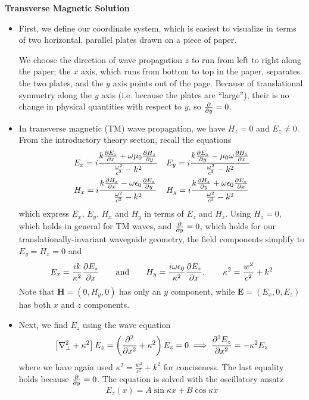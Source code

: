 \documentclass[11pt, a4paper]{article}
\newcommand{\eqtext}[1]{\qquad \text{#1} \qquad}
\renewcommand{\vec}[1]{\bm{#1}} %
\newcommand{\E}{\vec{E}}  %
\renewcommand{\H}{\vec{H}}  %
\newcommand{\ee}{\epsilon_{0}}  %
\newcommand{\mm}{\mu_{0}}  %
\newcommand{\m}{\vec{m}}  %
\renewcommand{\laplacian}{\nabla^{2}}
\begin{document}
\vspace{2mm}
\textbf{Transverse Magnetic Solution}
\begin{itemize}
	\item First, we define our coordinate system, which is easiest to visualize in terms of two horizontal, parallel plates drawn on a piece of paper.
	
	We choose the direction of wave propagation $ z $ to run from left to right along the paper; the $ x $ axis, which runs from bottom to top in the paper, separates the two plates, and the $ y $ axis points out of the page. Because of translational symmetry along the $ y $ axis (i.e. because the plates are ``large''), their is no change in physical quantities with respect to $ y $, so $ \pdv{y} = 0 $.
	
	\item In transverse magnetic (TM) wave propagation, we have $ H_{z} = 0 $ and $ E_{z} \neq 0 $. From the introductory theory section, recall the equations
	\begin{align*}
		&E_{x} = i \frac{k \pdv{E_{z}}{x} + \omega \mm \pdv{H_{z}}{y}}{\frac{\omega^{2}}{c^{2}} - k^{2}} && E_{y} = i \frac{k \pdv{E_{z}}{y} - \mm \omega \pdv{H_{z}}{x}}{\frac{\omega^{2}}{c^{2}} - k^{2}}\\
		&H_{x} = i \frac{k\pdv{H_{z}}{x} - \omega \ee \pdv{E_{z}}{y}}{\frac{\omega^{2}}{c^{2}} - k^{2}} && H_{y} = i \frac{k\pdv{H_{z}}{y} + \omega \ee \pdv{E_{z}}{x}}{\frac{\omega^{2}}{c^{2}} - k^{2}}
	\end{align*}
	which express $ E_{x}$, $ E_{y} $, $ H_{x} $ and $ H_{y} $ in terms of $ E_{z} $ and $ H_{z} $. Using $ H_{z} = 0 $, which holds in general for TM waves, and $ \pdv{y} = 0 $, which holds for our translationally-invariant waveguide geometry, the field components simplify to $ E_{y} = H_{x} = 0 $ and
	\begin{align*}
		E_{x} = \frac{ik}{\kappa^{2}} \pdv{E_{z}}{x} \eqtext{and} H_{y} = \frac{i\omega \ee}{\kappa^{2}}\pdv{E_{z}}{x}, \qquad \kappa^{2} = \frac{w^{2}}{c^{2}} + k^{2}
	\end{align*}
	Note that $ \H = (0, H_{y}, 0) $ has only an $ y $ component, while $ \E = (E_{x}, 0, E_{z}) $ has both $ x $ and $ z $ components.
	
	\item Next, we find $ E_{z} $ using the wave equation
	\begin{equation*}
		\left[\laplacian_{\perp} + \kappa^{2}\right]E_{z} = \left(\pdv[2]{}{x} + \kappa^{2}\right)E_{z} = 0 \implies \pdv[2]{E_{z}}{x} = - \kappa^{2}E_{z}
	\end{equation*}
	where we have again used $ \kappa^{2} = \frac{w^{2}}{c^{2}} + k^{2} $ for conciseness. The last equality holds because $ \pdv{y} = 0 $. The equation is solved with the oscillatory ansatz
	\begin{equation*}
		E_{z}(x) = A\sin \kappa x + B \cos \kappa x
	\end{equation*}
	

\end{itemize}
\end{document}
